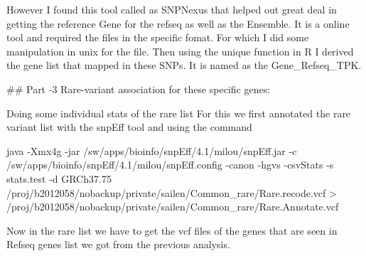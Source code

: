  However I found this tool called as SNPNexus that helped out great deal in getting the reference Gene for the refseq as well as the Ensemble. It is a online tool and required the files in the specific fomat. For which I did some manipulation in unix for the file. Then using the unique function in R I derived the gene list that mapped in these SNPs. It is named as the Gene_Refseq_TPK.
 
 ## Part -3 Rare-variant association for these specific genes:
 
 Doing some individual stats of the rare list
 For this we first annotated the rare variant list with the snpEff tool and using the command
 
 java -Xmx4g -jar /sw/apps/bioinfo/snpEff/4.1/milou/snpEff.jar -c /sw/apps/bioinfo/snpEff/4.1/milou/snpEff.config  -canon -hgvs -csvStats -s stats.test -d  GRCh37.75  /proj/b2012058/nobackup/private/sailen/Common_rare/Rare.recode.vcf  > /proj/b2012058/nobackup/private/sailen/Common_rare/Rare.Annotate.vcf
 
 Now in the rare list we have to get the vcf files of the genes that are seen in Refseq genes list we got from the previous analysis.
 
 
 

